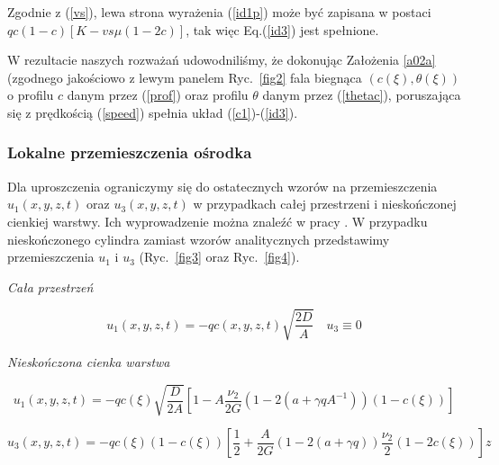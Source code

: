 \medskip 

Zgodnie z (\ref{vs}), lewa strona wyrażenia (\ref{id1p}) może być zapisana w postaci \\\mbox{$q c (1-c)\left[ K -vs \mu (1-2c) \right]$}, tak więc Eq.(\ref{id3}) jest spełnione. 

\medskip 

W rezultacie naszych rozważań udowodniliśmy, że dokonując Założenia \ref{a02a} (zgodnego jakościowo z lewym panelem Ryc.~\ref{fig2} fala biegnąca $(c(\xi),\theta(\xi))$ o profilu $c$ danym przez (\ref{prof}) oraz profilu $\theta$ danym przez (\ref{thetac}), poruszająca się z prędkością (\ref{speed}) spełnia układ (\ref{c1})-(\ref{id3}). 

\medskip

\subsubsection{Lokalne przemieszczenia ośrodka}

\medskip

Dla uproszczenia ograniczymy się do ostatecznych wzorów na przemieszczenia \\$u_1(x,y,z,t)$ oraz $u_3(x,y,z,t)$ w przypadkach całej przestrzeni i nieskończonej cienkiej warstwy. Ich wyprowadzenie można znaleźć w pracy \cite{Kazmierczak2011}. W przypadku nieskończonego cylindra zamiast wzorów analitycznych przedstawimy przemieszczenia $u_1$ i $u_3$ (Ryc.~\ref{fig3} oraz Ryc.~\ref{fig4}). 
\medskip 

\noindent \textit{Cała przestrzeń}

\smallskip


\[  u_1(x,y,z,t) = - q c(x,y,z,t) \sqrt{\frac{2D}{A}} \quad u_3 \equiv 0 \] 

\medskip  

\noindent \textit{Nieskończona cienka warstwa}

\smallskip


\[ u_1(x,y,z,t) = - q c(\xi)\sqrt{\frac{D}{2A}} 
\left[ 1 - A  \frac{\nu_2}{2G} ( 1 - 2 (a + \gamma q A^{-1}) ) (1-c(\xi)) 
\right] 
\]

\[
{\displaystyle 
	u_3(x,y,z,t) = - q c(\xi) (1-c(\xi)) \left[ \frac 1 2 +   \frac{A}{2G} 
	( 1 - 2 (a + \gamma q) ) \frac{\nu_2}{2} (1-2c(\xi)) \right] z}
\]
\medskip 

